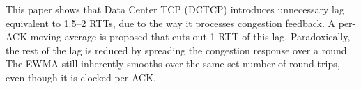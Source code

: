 This paper shows that Data Center TCP (DCTCP) introduces unnecessary lag equivalent to 1.5--2 RTTs, due to the way it processes congestion feedback. A per-ACK moving average is proposed that cuts out 1 RTT of this lag. Paradoxically, the rest of the lag is reduced by spreading the congestion response over a round. The EWMA still inherently smooths over the same set number of round trips, even though it is clocked per-ACK.